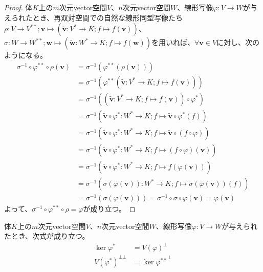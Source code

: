 \documentclass[dvipdfmx]{jsarticle}
\begin{document}
\begin{proof}
体$K$上の$m$次元vector空間$V$、$n$次元vector空間$W$、線形写像$\varphi:V \rightarrow W$が与えられたとき、再双対空間での自然な線形同型写像たち$\rho:V \rightarrow V^{**};\mathbf{v} \mapsto \left( \widetilde{\mathbf{v}}:V^{*} \rightarrow K;f \mapsto f\left( \mathbf{v} \right) \right)$、$\sigma:W \rightarrow W^{**};\mathbf{w} \mapsto \left( \widetilde{\mathbf{w}}:W^{*} \rightarrow K;f \mapsto f\left( \mathbf{w} \right) \right)$を用いれば、$\forall\mathbf{v} \in V$に対し、次のようになる。
\begin{align*}
\sigma^{- 1} \circ \varphi^{**} \circ \rho\left( \mathbf{v} \right) &= \sigma^{- 1}\left( \varphi^{**}\left( \rho\left( \mathbf{v} \right) \right) \right)\\
&= \sigma^{- 1}\left( \varphi^{**}\left( \widetilde{\mathbf{v}}:V^{*} \rightarrow K;f \mapsto f\left( \mathbf{v} \right) \right) \right)\\
&= \sigma^{- 1}\left( \left( \widetilde{\mathbf{v}}:V^{*} \rightarrow K;f \mapsto f\left( \mathbf{v} \right) \right) \circ \varphi^{*} \right)\\
&= \sigma^{- 1}\left( \widetilde{\mathbf{v}} \circ \varphi^{*}:W^{*} \rightarrow K;f \mapsto \widetilde{\mathbf{v}} \circ \varphi^{*}(f) \right)\\
&= \sigma^{- 1}\left( \widetilde{\mathbf{v}} \circ \varphi^{*}:W^{*} \rightarrow K;f \mapsto \widetilde{\mathbf{v}} \circ (f \circ \varphi) \right)\\
&= \sigma^{- 1}\left( \widetilde{\mathbf{v}} \circ \varphi^{*}:W^{*} \rightarrow K;f \mapsto (f \circ \varphi)\left( \mathbf{v} \right) \right)\\
&= \sigma^{- 1}\left( \widetilde{\mathbf{v}} \circ \varphi^{*}:W^{*} \rightarrow K;f \mapsto f\left( \varphi\left( \mathbf{v} \right) \right) \right)\\
&= \sigma^{- 1}\left( \sigma\left( \varphi\left( \mathbf{v} \right) \right):W^{*} \rightarrow K;f \mapsto \sigma\left( \varphi\left( \mathbf{v} \right) \right)(f) \right)\\
&= \sigma^{- 1}\left( \sigma\left( \varphi\left( \mathbf{v} \right) \right) \right) = \sigma^{- 1} \circ \sigma \circ \varphi\left( \mathbf{v} \right) = \varphi\left( \mathbf{v} \right)
\end{align*}
よって、$\sigma^{- 1} \circ \varphi^{**} \circ \rho = \varphi$が成り立つ。
\end{proof}
\begin{thm}\label{2.4.4.15}
体$K$上の$m$次元vector空間$V$、$n$次元vector空間$W$、線形写像$\varphi:V \rightarrow W$が与えられたとき、次式が成り立つ。
\begin{align*}
\ker\varphi^{*} &= {V(\varphi)}^{\bot}\\
V\left( \varphi^{*} \right)^{\bot\bot} &= {\ker\varphi^{**}}^{\bot}
\end{align*}
\end{thm}
\end{document}
